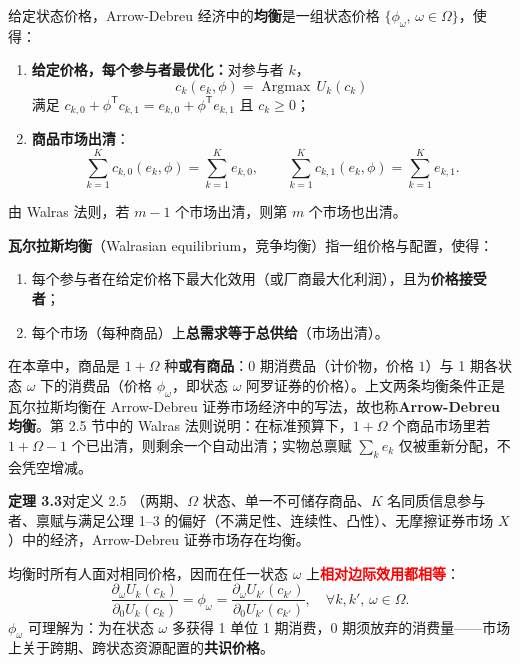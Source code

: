 \begin{tcolorbox}[knowledge,title=3.5 市场均衡]
给定状态价格，Arrow-Debreu 经济中的\textbf{均衡}是一组状态价格 $\{\phi_{\omega},\,\omega\in\Omega\}$，使得：
\begin{enumerate}
    \item \textbf{给定价格，每个参与者最优化：}对参与者 $k$，
    \[
        c_k(e_k,\phi)=\operatorname*{Argmax}\,U_k(c_k)
    \]
    满足 $c_{k,0}+\phi^{\mathsf T}c_{k,1}=e_{k,0}+\phi^{\mathsf T}e_{k,1}$ 且 $c_k\ge 0$；
    \item \textbf{商品市场出清}：
    \[
        \sum_{k=1}^{K}c_{k,0}(e_k,\phi)=\sum_{k=1}^{K}e_{k,0},\qquad
        \sum_{k=1}^{K}c_{k,1}(e_k,\phi)=\sum_{k=1}^{K}e_{k,1}.
    \]
\end{enumerate}
由 Walras 法则，若 $m-1$ 个市场出清，则第 $m$ 个市场也出清。

\begin{tcolorbox}[knowledge,title=瓦尔拉斯均衡]
\textbf{瓦尔拉斯均衡}（Walrasian equilibrium，竞争均衡）指一组价格与配置，使得：
\begin{enumerate}
    \item 每个参与者在给定价格下最大化效用（或厂商最大化利润），且为\textbf{价格接受者}；
    \item 每个市场（每种商品）上\textbf{总需求等于总供给}（市场出清）。
\end{enumerate}
在本章中，商品是 $1+\Omega$ 种\textbf{或有商品}：0 期消费品（计价物，价格 $1$）与 1 期各状态 $\omega$ 下的消费品（价格 $\phi_\omega$，即状态 $\omega$ 阿罗证券的价格）。上文两条均衡条件正是瓦尔拉斯均衡在 Arrow-Debreu 证券市场经济中的写法，故也称\textbf{Arrow-Debreu 均衡}。第 2.5 节中的 Walras 法则说明：在标准预算下，$1+\Omega$ 个商品市场里若 $1+\Omega-1$ 个已出清，则剩余一个自动出清；实物总禀赋 $\sum_k e_k$ 仅被重新分配，不会凭空增减。
\end{tcolorbox}

\begin{tcolorbox}[knowledge]
\textbf{定理 3.3}\quad 对定义 2.5 （两期、$\Omega$ 状态、单一不可储存商品、$K$ 名同质信息参与者、禀赋与满足公理 1–3 的偏好（不满足性、连续性、凸性）、无摩擦证券市场 $X$）中的经济，Arrow-Debreu 证券市场存在均衡。
\end{tcolorbox}

均衡时所有人面对相同价格，因而在任一状态 $\omega$ 上\textcolor{red}{\textbf{相对边际效用都相等}}：
\[
    \frac{\partial_{\omega}U_k(c_k)}{\partial_0 U_k(c_k)}
    =\phi_{\omega}
    =\frac{\partial_{\omega}U_{k'}(c_{k'})}{\partial_0 U_{k'}(c_{k'})},
    \quad\forall k,k',\,\omega\in\Omega.
    \tag{3.9}
\]
$\phi_{\omega}$ 可理解为：为在状态 $\omega$ 多获得 1 单位 1 期消费，0 期须放弃的消费量——市场上关于跨期、跨状态资源配置的\textbf{共识价格}。

\end{tcolorbox}

